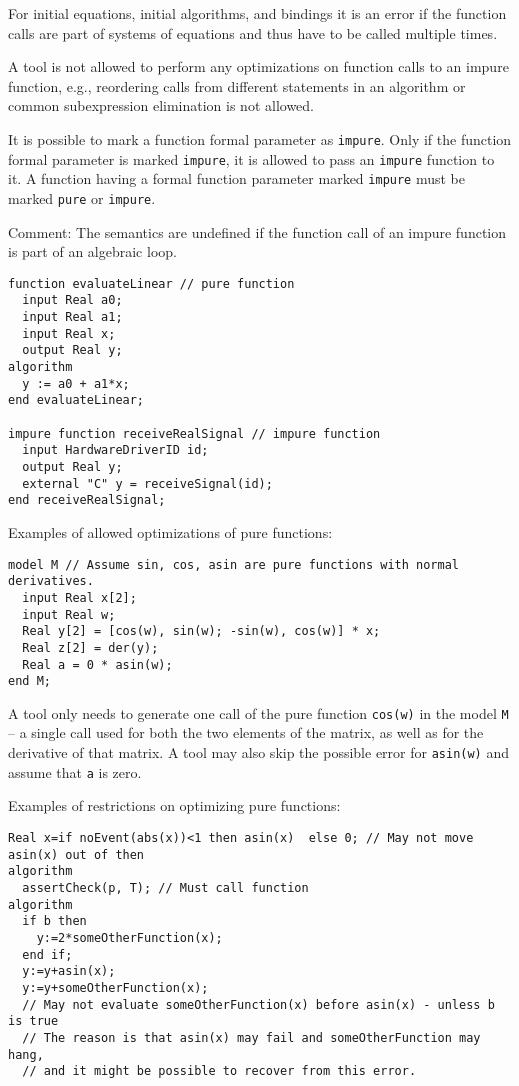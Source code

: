 For initial equations, initial algorithms, and bindings it is an error
if the function calls are part of systems of equations and thus have to
be called multiple times.

\begin{nonnormative}
A tool is not allowed to perform any optimizations on function
calls to an impure function, e.g., reordering calls from different
statements in an algorithm or common subexpression elimination is not
allowed.
\end{nonnormative}

It is possible to mark a function formal parameter as \lstinline!impure!. Only if
the function formal parameter is marked \lstinline!impure!, it is allowed to pass an
\lstinline!impure! function to it. A function having a formal function parameter
marked \lstinline!impure! must be marked \lstinline!pure! or \lstinline!impure!.

\begin{nonnormative}
Comment: The semantics are undefined if the function call of an
impure function is part of an algebraic loop.
\end{nonnormative}

\begin{example}
\begin{lstlisting}[language=modelica]
function evaluateLinear // pure function
  input Real a0;
  input Real a1;
  input Real x;
  output Real y;
algorithm
  y := a0 + a1*x;
end evaluateLinear;

impure function receiveRealSignal // impure function
  input HardwareDriverID id;
  output Real y;
  external "C" y = receiveSignal(id);
end receiveRealSignal;
\end{lstlisting}
Examples of allowed optimizations of pure functions:
\begin{lstlisting}[language=modelica]
model M // Assume sin, cos, asin are pure functions with normal derivatives.
  input Real x[2];
  input Real w;
  Real y[2] = [cos(w), sin(w); -sin(w), cos(w)] * x;
  Real z[2] = der(y);
  Real a = 0 * asin(w);
end M;
\end{lstlisting}
A tool only needs to generate one call of the pure function \lstinline!cos(w)! in the model \lstinline!M! -- a single call used for both the two elements of the matrix, as well as for the derivative
of that matrix.  A tool may also skip the possible error for \lstinline!asin(w)! and assume that \lstinline!a! is zero.

Examples of restrictions on optimizing pure functions:
\begin{lstlisting}[language=modelica]
  Real x=if noEvent(abs(x))<1 then asin(x)  else 0; // May not move asin(x) out of then
algorithm
  assertCheck(p, T); // Must call function
algorithm
  if b then
    y:=2*someOtherFunction(x);
  end if;
  y:=y+asin(x);
  y:=y+someOtherFunction(x);
  // May not evaluate someOtherFunction(x) before asin(x) - unless b is true
  // The reason is that asin(x) may fail and someOtherFunction may hang,
  // and it might be possible to recover from this error.
\end{lstlisting}
\end{example}

